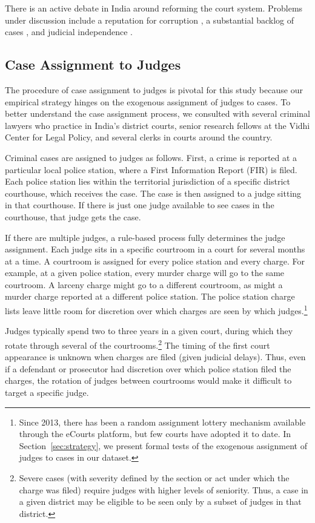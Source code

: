 \documentclass[12pt,english]{article}
\begin{document}
There is an active debate in India around reforming the court system. Problems under discussion include a reputation for corruption \citep{dev2019}, a substantial backlog of cases \citep{trusts2019india}, and judicial independence \citep{economist2024}. 

\subsection{Case Assignment to Judges}

The procedure of case assignment to judges is pivotal for this study because our empirical strategy hinges on the exogenous assignment of judges to cases. To better understand the case assignment process, we consulted with several criminal lawyers who practice in India's district courts, senior research fellows at the Vidhi Center for Legal Policy, and several clerks in courts around the country. 

Criminal cases are assigned to judges as follows. First, a crime is reported at a particular local  police station, where a First Information Report (FIR) is filed. Each police station lies within the territorial jurisdiction of a specific district courthouse, which receives the case. The case is then assigned to a judge sitting in that courthouse. If there is just one judge available to see cases in the courthouse, that judge gets the case.

If there are multiple judges, a rule-based process fully determines the judge assignment. Each judge sits in a specific courtroom in a court for several months at a time. A courtroom is assigned for every police station and every charge. For example, at a given police station, every murder charge will go to the same courtroom. A larceny charge might go to a different courtroom, as might a murder charge reported at a different police station. The police station charge lists leave little room for discretion over which charges are seen by which judges.\footnote{Since 2013, there has been a random assignment lottery mechanism available through the eCourts platform, but few courts have adopted it to date. In Section~\ref{sec:strategy}, we present formal tests of the exogenous assignment of judges to cases in our dataset.} 

Judges typically spend two to three years in a given court, during which they rotate through several of the courtrooms.\footnote{Severe cases (with severity defined by the section or act under which the charge was filed) require judges with higher levels of seniority. Thus, a case in a given district may be eligible to be seen only by a subset of judges in that district.} The timing of the first court appearance is unknown when charges are filed (given judicial delays). Thus, even if a defendant or prosecutor had discretion over which police station filed the charges, the rotation of judges between courtrooms would make it difficult to target a specific judge. 
\end{document}
